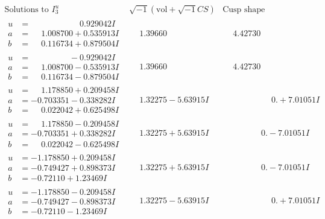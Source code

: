 \documentclass[1p]{elsarticle_modified}
\theoremstyle{definition}
\newcommand{\I}{\sqrt{-1}}
\begin{document}
$$\begin{array}{c|c|c}  
\text{Solutions to }I^u_{3}& \I (\text{vol} + \sqrt{-1}CS) & \text{Cusp shape}\\
 \hline 
\begin{aligned}
u &= \phantom{-0.000000 -}0.929042 I \\
a &= \phantom{-}1.008700 + 0.535913 I \\
b &= \phantom{-}0.116734 + 0.879504 I\end{aligned}
 & \phantom{-}1.39660\phantom{ +0.000000I} & \phantom{-}4.42730\phantom{ +0.000000I} \\ \hline\begin{aligned}
u &= \phantom{-0.000000 } -0.929042 I \\
a &= \phantom{-}1.008700 - 0.535913 I \\
b &= \phantom{-}0.116734 - 0.879504 I\end{aligned}
 & \phantom{-}1.39660\phantom{ +0.000000I} & \phantom{-}4.42730\phantom{ +0.000000I} \\ \hline\begin{aligned}
u &= \phantom{-}1.178850 + 0.209458 I \\
a &= -0.703351 - 0.338282 I \\
b &= \phantom{-}0.022042 + 0.625498 I\end{aligned}
 & \phantom{-}1.32275 - 5.63915 I & \phantom{-0.000000 -}0. + 7.01051 I \\ \hline\begin{aligned}
u &= \phantom{-}1.178850 - 0.209458 I \\
a &= -0.703351 + 0.338282 I \\
b &= \phantom{-}0.022042 - 0.625498 I\end{aligned}
 & \phantom{-}1.32275 + 5.63915 I & \phantom{-0.000000 } 0. - 7.01051 I \\ \hline\begin{aligned}
u &= -1.178850 + 0.209458 I \\
a &= -0.749427 + 0.898373 I \\
b &= -0.72110 + 1.23469 I\end{aligned}
 & \phantom{-}1.32275 + 5.63915 I & \phantom{-0.000000 } 0. - 7.01051 I \\ \hline\begin{aligned}
u &= -1.178850 - 0.209458 I \\
a &= -0.749427 - 0.898373 I \\
b &= -0.72110 - 1.23469 I\end{aligned}
 & \phantom{-}1.32275 - 5.63915 I & \phantom{-0.000000 -}0. + 7.01051 I \\ \hline\begin{aligned}

\end{aligned}
\end{array}$$
\end{document}
